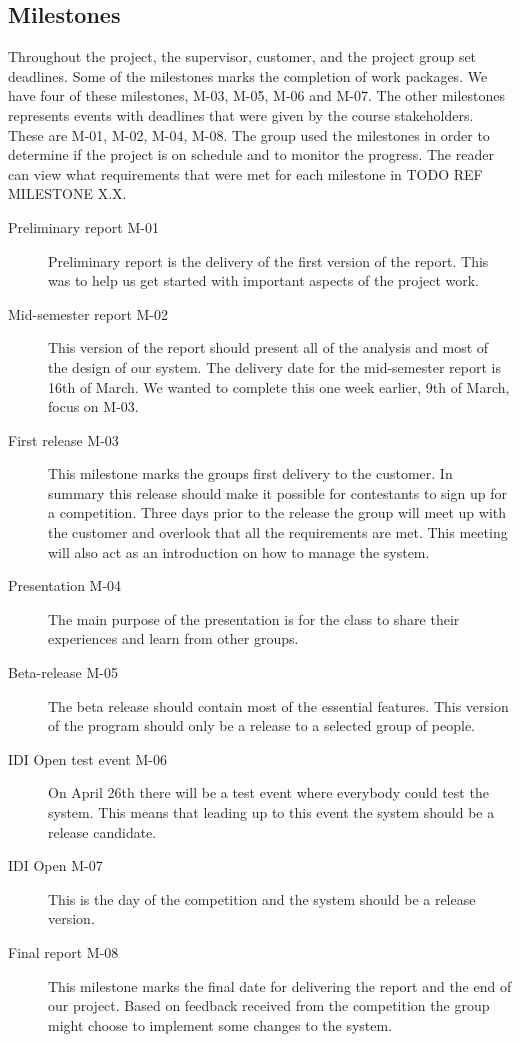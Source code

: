 \subsection{Milestones}
Throughout the project, the supervisor, customer, and the project group set
deadlines. Some of the milestones marks the completion of work packages. We
have four of these milestones, M-03, M-05, M-06 and M-07. The other milestones
represents events with deadlines that were given by the course stakeholders.
These are M-01, M-02, M-04, M-08. The group used the milestones in order
to determine if the project is on schedule and to monitor the progress.
The reader can view what requirements that were met for each milestone
in TODO REF MILESTONE X.X.

\begin{description}
    \item[Preliminary report M-01]
    Preliminary report is the delivery of the first version of the report.
    This was to help us get started with important aspects of the project work.

    \item[Mid-semester report M-02]
    This version of the report should present all of the analysis and most of
    the design of our system. The delivery date for the mid-semester report
    is 16th of March. We wanted to complete this one week earlier, 9th of March,
    focus on M-03.

    \item[First release M-03]
    This milestone marks the groups first delivery to the customer. In summary
    this release should make it possible for contestants to sign up for a
    competition. Three days prior to the release the group will meet up with
    the customer and overlook that all the requirements are met. This meeting
    will also act as an introduction on how to manage the system.

    \item[Presentation M-04]
    The main purpose of the presentation is for the class to share their
    experiences and learn from other groups. 

    \item[Beta-release M-05]
    The beta release should contain most of the essential features.  This
    version of the program should only be a release to a selected group of
    people. 

    \item[IDI Open test event M-06]
    On April 26th there will be a test event where everybody could test the
    system. This means that leading up to this event the system should be a
    release candidate. 

    \item[IDI Open M-07]
    This is the day of the competition and the system should be a release
    version. 

    \item[Final report M-08]
    This milestone marks the final date for delivering the report and the end
    of our project. Based on feedback received from the competition the group
    might choose to implement some changes to the system. 
\end{description}

